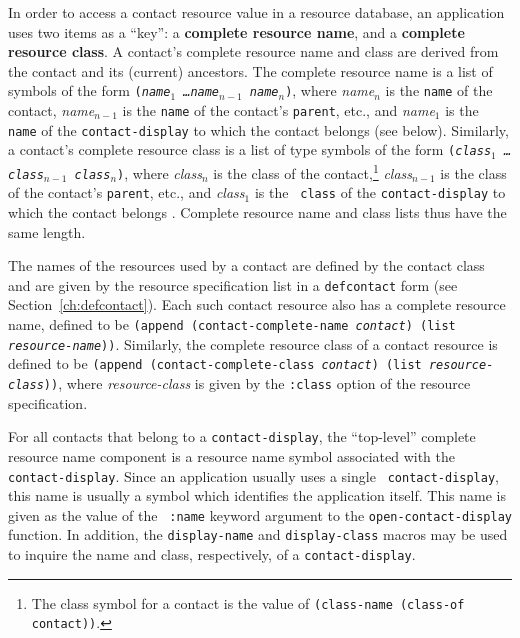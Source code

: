 \documentclass[twoside]{book}
\begin{document}
\begin{sloppy}
In order to access a contact resource value in a resource database, an
application uses two items as a ``key'': a {\bf complete resource name},
and a {\bf complete resource class}. A
contact's complete resource
name and class are derived from the contact and its (current) ancestors. The
complete resource name is a list of symbols of the form {\tt ({\em name$_{1}$
\ldots name$_{n-1}$  name$_{n}$})}, where {\em name$_{n}$} is the
{\tt name} of the contact, {\em name$_{n-1}$} is the {\tt name} of
the contact's {\tt parent}, etc., and {\em name$_{1}$} is the {\tt
name} of the {\tt contact-display} to which the contact belongs (see below).
Similarly, a contact's complete resource class is a list of type symbols of the form
{\tt ({\em class$_{1}$
\ldots class$_{n-1}$  class$_{n}$})}, where {\em class$_{n}$} is the
class of the contact,\footnote{The class symbol for a contact is the value
of {\tt (class-name (class-of contact))}.} 
{\em class$_{n-1}$} is the class of
the contact's {\tt parent}, etc., and {\em class$_{1}$} is the {\tt
class} of
the {\tt contact-display} to which the contact belongs \footnotemark
{}. Complete resource name and class lists thus have the same length. 

The names of the resources used by a contact are defined by the contact class
and are given by the resource specification list 
in a {\tt defcontact} form (see Section~\ref{ch:defcontact}). Each such contact
resource also has a complete resource name, defined to be {\tt (append
(contact-complete-name {\em contact}) (list {\em
resource-name}))}. Similarly, the complete resource
class of a contact resource is defined to be {\tt (append
(contact-complete-class {\em contact})
(list {\em resource-class}))}, where {\em resource-class} is given by the
{\tt :class} option of the resource specification.

For all contacts that belong
to a {\tt contact-display}, the ``top-level'' complete resource name component
is a resource name symbol associated with the {\tt
contact-display}. Since an application usually uses a single {\tt
contact-display}, this name is usually a symbol which identifies the
application itself. This name is given as the value of the {\tt
:name} keyword argument to the {\tt open-contact-display} function. 
In addition,
the {\tt display-name} and {\tt display-class}
macros may be used to inquire  the name and class, respectively, of a
{\tt contact-display}.


\end{sloppy}
\end{document}
